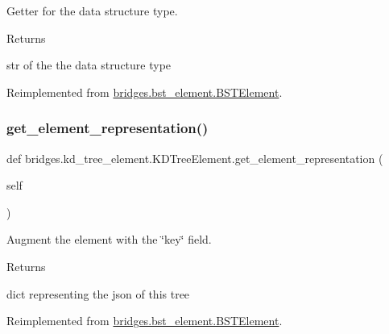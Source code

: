 Getter for the data structure type. 

\begin{DoxyReturn}{Returns}


str of the the data structure type 
\end{DoxyReturn}


Reimplemented from \mbox{\hyperlink{classbridges_1_1bst__element_1_1_b_s_t_element_a8e655e06ba0f77b7e2681b6d291f39de}{bridges.\+bst\+\_\+element.\+B\+S\+T\+Element}}.

\mbox{\label{classbridges_1_1kd__tree__element_1_1_k_d_tree_element_a4e08a6f2e4ff70be2b0dfd6eacdcf10e}} 
\subsubsection{\texorpdfstring{get\_element\_representation()}{get\_element\_representation()}}
{\footnotesize\ttfamily def bridges.\+kd\+\_\+tree\+\_\+element.\+K\+D\+Tree\+Element.\+get\+\_\+element\+\_\+representation (\begin{DoxyParamCaption}\item[{}]{self }\end{DoxyParamCaption})}



Augment the element with the \char`\"{}key\char`\"{} field. 

\begin{DoxyReturn}{Returns}


dict representing the json of this tree 
\end{DoxyReturn}


Reimplemented from \mbox{\hyperlink{classbridges_1_1bst__element_1_1_b_s_t_element_a9d038f191a7cf06e75910463a3aa3b80}{bridges.\+bst\+\_\+element.\+B\+S\+T\+Element}}.

\mbox{\label{classbridges_1_1kd__tree__element_1_1_k_d_tree_element_afa4f059c61b3cd9460199c9835641db2}} 
